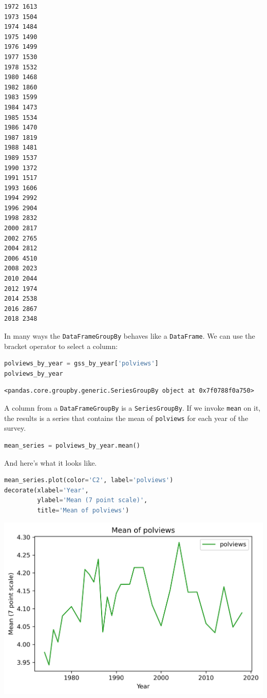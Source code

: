 \begin{lstlisting}[style=output]
1972 1613
1973 1504
1974 1484
1975 1490
1976 1499
1977 1530
1978 1532
1980 1468
1982 1860
1983 1599
1984 1473
1985 1534
1986 1470
1987 1819
1988 1481
1989 1537
1990 1372
1991 1517
1993 1606
1994 2992
1996 2904
1998 2832
2000 2817
2002 2765
2004 2812
2006 4510
2008 2023
2010 2044
2012 1974
2014 2538
2016 2867
2018 2348
\end{lstlisting}

In many ways the \passthrough{\lstinline!DataFrameGroupBy!} behaves like
a \passthrough{\lstinline!DataFrame!}. We can use the bracket operator
to select a column:

\begin{lstlisting}[language=Python,style=source]
polviews_by_year = gss_by_year['polviews']
polviews_by_year
\end{lstlisting}

\begin{lstlisting}[style=output]
<pandas.core.groupby.generic.SeriesGroupBy object at 0x7f0788f0a750>
\end{lstlisting}

A column from a \passthrough{\lstinline!DataFrameGroupBy!} is a
\passthrough{\lstinline!SeriesGroupBy!}. If we invoke
\passthrough{\lstinline!mean!} on it, the results is a series that
contains the mean of \passthrough{\lstinline!polviews!} for each year of
the survey.

\begin{lstlisting}[language=Python,style=source]
mean_series = polviews_by_year.mean()
\end{lstlisting}

And here's what it looks like.

\begin{lstlisting}[language=Python,style=source]
mean_series.plot(color='C2', label='polviews')
decorate(xlabel='Year', 
         ylabel='Mean (7 point scale)',
         title='Mean of polviews')
\end{lstlisting}

\begin{center}
\includegraphics[scale=0.75]{02_polviews_files/02_polviews_46_0.png}
\end{center}

